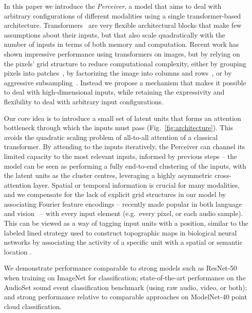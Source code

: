 \documentclass{article}
\begin{document}
In this paper we introduce the \textit{Perceiver}, a model that aims to deal with arbitrary configurations of different modalities using a single transformer-based architecture. Transformers~\cite{vaswani2017attention} are very flexible architectural blocks that make few assumptions about their inputs, but that also scale quadratically with the number of inputs in terms of both memory and computation. Recent work has shown impressive performance using transformers on images, but by relying on the pixels' grid structure to reduce computational complexity, either by grouping pixels into patches~\cite{dosovitskiy2020image,touvron2020training}, by factorizing the image into columns and rows~\cite{ho2019axial, child2019generating}, or by aggressive subsampling~\cite{chen2020generative}. Instead we propose a mechanism that makes it possible to deal with high-dimensional inputs, while retaining the expressivity and flexibility to deal with arbitrary input configurations.

Our core idea is to introduce a small set of latent units that forms an attention bottleneck through which the inputs must pass (Fig.~\ref{fig:architecture}). This avoids the quadratic scaling problem of all-to-all attention of a classical transformer.
By attending to the inputs iteratively, the Perceiver can channel its limited capacity to the most relevant inputs, informed by previous steps -- the model can be seen as performing a fully end-to-end clustering of the inputs, with the latent units as the cluster centres,  leveraging a highly asymmetric cross-attention layer. Spatial or temporal information is crucial for many modalities, and we compensate for the lack of explicit grid structures in our model by associating Fourier feature encodings -- recently made popular in both language and vision~\cite{vaswani2017attention, mildenhall2020nerf} -- with every input element (e.g.\ every pixel, or each audio sample). This can be viewed as a way of tagging input units with a position, similar to the labeled lined strategy used to construct topographic maps in biological neural networks by associating the activity of a specific unit with a spatial or semantic location \cite{kandel2012principles}.

We demonstrate performance comparable to strong models such as ResNet-50 when training on ImageNet for classification; state-of-the-art performance on the AudioSet sound event classification benchmark (using raw audio, video, or both); and strong performance relative to comparable approaches on ModelNet-40 point cloud classification. 
\end{document}
